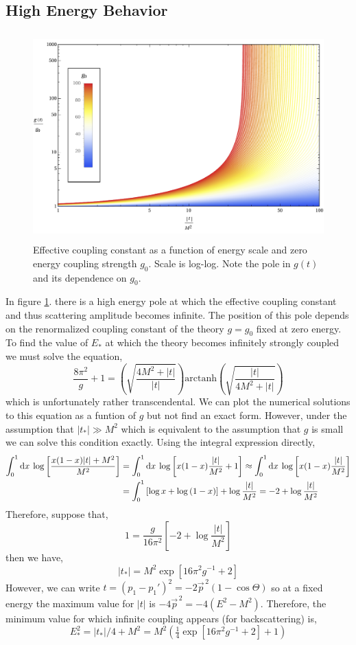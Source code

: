 \documentclass[12pt]{article}
\begin{document}
\subsection*{High Energy Behavior}

\begin{figure}
\begin{center}
\includegraphics[width = 12cm, height = 8cm]{CouplingConstant}
\caption{Effective coupling constant as a function of energy scale and zero energy coupling strength $g_0$. Scale is log-log. Note the pole in $g(t)$ and its dependence on $g_0$. }
\label{scattering}
\end{center}
\end{figure}

In figure \ref{scattering}. there is a high energy pole at which the effective coupling constant and thus scattering amplitude becomes infinite. The position of this pole depends on the renormalized coupling constant of the theory $g = g_0$ fixed at zero energy. To find the value of $E_*$ at which the theory becomes infinitely strongly coupled we must solve the equation,
\[\frac{8 \pi^2}{g} + 1 = \left( \sqrt{\frac{4 M^2 + |t|}{|t|}} \right) \mathrm{arctanh} \left( \sqrt{\frac{|t|}{4 M^2 + |t|}} \right) \]
which is unfortunately rather transcendental. We can plot the numerical solutions to this equation as a funtion of $g$ but not find an exact form. However, under the assumption that $|t_*| \gg M^2$ which is equivalent to the assumption that $g$ is small we can solve this condition exactly. Using the integral expression directly, 
\begin{align*}
\int_0^1 \mathrm{d}x \: \log{\left[ \frac{x(1-x)|t| + M^2}{M^2} \right]} & = \int_0^1 \mathrm{d}x \: \log{\left[ x(1 - x) \frac{|t|}{M^2} + 1 \right]} \approx \int_0^1 \mathrm{d}x \: \log{\left[ x(1 - x) \frac{|t|}{M^2} \right]}
\\
& = \int_0^1 \left[ \log{x} + \log{(1-x)} \right] + \log{\frac{|t|}{M^2}}  = -2 + \log{\frac{|t|}{M^2}}
\end{align*}
Therefore, suppose that,
\[ 1 = \frac{g}{16 \pi^2} \left[-2 + \log{\frac{|t|}{M^2}} \right] \]
then we have,
\[ |t_*| = M^2 \exp{\left[16 \pi^2 g^{-1} + 2\right]} \]
However, we can write $t = (p_1 - p_1')^2 = -2 \vec{p}^{\, 2}(1 - \cos{\Theta})$ so at a fixed energy the maximum value for $|t|$ is $-4 \vec{p}^{\, 2} = - 4 (E^2 - M^2)$. Therefore, the minimum value for which infinite coupling appears (for backscattering) is,
\[ E_*^2 = |t_*|/4 + M^2 = M^2( \tfrac{1}{4} \exp{\left[16\pi^2 g^{-1} + 2\right]}  + 1) \]
\end{document}
